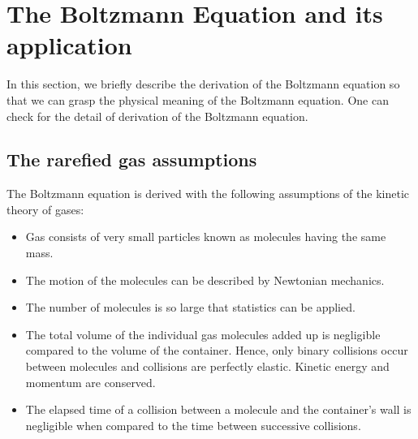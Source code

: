 \documentclass{article}
\begin{document}
\section{The Boltzmann Equation and its application}
In this section, we briefly describe the derivation of the Boltzmann equation so that we can grasp the physical meaning of the Boltzmann equation. One can check \cite{RarefiedGasD, IntroBoltz} for the detail of derivation of the Boltzmann equation.
\subsection{The rarefied gas assumptions}
The Boltzmann equation is derived with the following assumptions of the kinetic theory of gases:
\begin{itemize}
\item Gas consists of very small particles known as molecules having the same mass.
\item The motion of the molecules can be described by Newtonian mechanics.
\item The number of molecules is so large that statistics can be applied.
\item The total volume of the individual gas molecules added up is negligible compared to the volume of the container. Hence, only binary collisions occur between molecules and collisions are perfectly elastic. Kinetic energy and momentum are conserved.
\item The elapsed time of a collision between a molecule and the container's wall is negligible when compared to the time between successive collisions.
\end{itemize}
\end{document}
